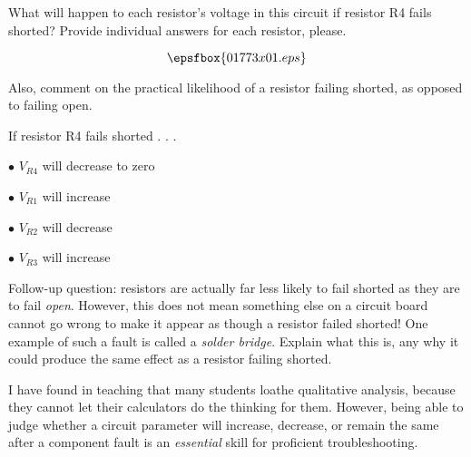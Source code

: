 

What will happen to each resistor's voltage in this circuit if resistor R4 fails shorted?  Provide individual answers for each resistor, please.

$$\epsfbox{01773x01.eps}$$

Also, comment on the practical likelihood of a resistor failing shorted, as opposed to failing open.







If resistor R4 fails shorted . . .

\medskip
\item{$\bullet$} $V_{R4}$ will decrease to zero
\item{$\bullet$} $V_{R1}$ will increase
\item{$\bullet$} $V_{R2}$ will decrease
\item{$\bullet$} $V_{R3}$ will increase
\medskip

\vskip 10pt

Follow-up question: resistors are actually far less likely to fail shorted as they are to fail {\it open}.  However, this does not mean something else on a circuit board cannot go wrong to make it appear as though a resistor failed shorted!  One example of such a fault is called a {\it solder bridge}.  Explain what this is, any why it could produce the same effect as a resistor failing shorted.







I have found in teaching that many students loathe qualitative analysis, because they cannot let their calculators do the thinking for them.  However, being able to judge whether a circuit parameter will increase, decrease, or remain the same after a component fault is an {\it essential} skill for proficient troubleshooting.




